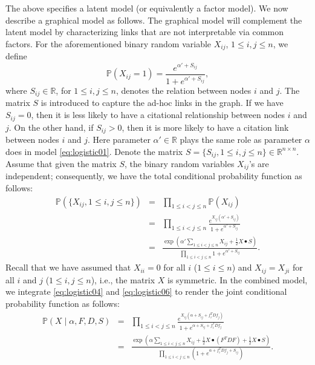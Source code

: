 \documentclass[AMS,STIX1COL]{WileyNJD-v2}
\begin{document}
The above specifies a latent model (or equivalently a factor model).
We now describe a graphical model as follows.
The graphical model will complement the latent model by characterizing links that are not interpretable via common factors.
For the aforementioned binary random variable $X_{ij}$, $1\le i,j \le n$, we define
\begin{equation}
\label{eq:logistic05}
\mathbb{P}(X_{ij}=1) = \frac{e^{\alpha' + S_{ij} }}{1 + e^{\alpha' + S_{ij} }},
\end{equation}
where $S_{ij} \in \mathbb{R}$, for $1\le i,j \le n$, denotes the relation between nodes $i$ and $j$.
The matrix $S$ is introduced to capture the ad-hoc links in the graph. 
If we have $S_{ij}=0$, then it is less likely to have a citational relationship between nodes $i$ and $j$.
On the other hand, if $S_{ij}>0$, then it is more likely to have a citation link between nodes $i$ and $j$.
Here parameter $\alpha' \in \mathbb{R}$ plays the same role as parameter $\alpha$ does in model \eqref{eq:logistic01}.
Denote the matrix $S = \{S_{ij}, 1\le i,j \le n \} \in \mathbb{R}^{n \times n}$.
Assume that given the matrix $S$, the binary random variables
$X_{ij}$'s are independent;
consequently, we have the total conditional probability function as follows:
\begin{eqnarray}
\mathbb{P}(\{X_{ij}, 1\le i,j \le n\})
&=& \prod_{1\le i<j \le n} \mathbb{P}(X_{ij}) \nonumber \\
&=& \prod_{1\le i<j \le n}  \frac{e^{X_{ij}(\alpha' + S_{ij}) }}{1 + e^{\alpha' + S_{ij} }} \nonumber \\
&=& \frac{\exp(\alpha' \sum_{1\le i< j\le n}X_{ij} +\frac{1}{2} X \bullet S)}{\prod_{1\le i<j \le n}  1 + e^{\alpha' + S_{ij} }}.
\label{eq:logistic06}
\end{eqnarray}
Recall that we have assumed that $X_{ii}=0$ for all $i$ ($1\le i \le n$) and $X_{ij} = X_{ji}$ for all $i$ and $j$ ($1\le i,j \le n$), i.e., the matrix $X$ is symmetric.
In the combined model, we integrate \eqref{eq:logistic04} and
\eqref{eq:logistic06} to render the joint conditional probability function as follows:
\begin{eqnarray}
\label{eq:logistic07}
\mathbb{P}(X \mid \alpha,  F, D, S)
&=&  \prod_{1\le i<j \le n}
\frac{e^{X_{ij}(\alpha + S_{ij} + f_i^T D f_j) }}{1 + e^{\alpha + S_{ij}+ f_i^T D f_j}} \nonumber \\
&=& \frac{\exp\left(\alpha \sum_{1\le i< j\le n}X_{ij} +\frac{1}{2} X \bullet (F^T D F) +\frac{1}{2} X \bullet S\right)}{\prod_{1\le i<j \le n}  \left(1 + e^{\alpha + f_i^T D f_j +S_{ij}}\right) }.
\end{eqnarray}
\end{document}
